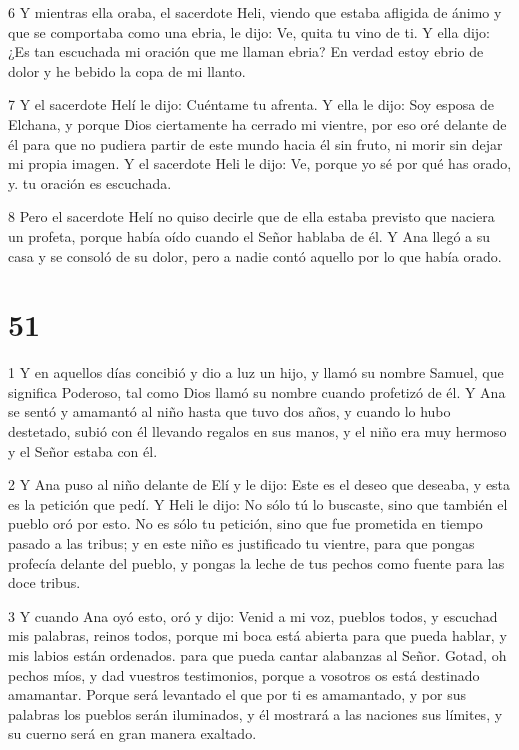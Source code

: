 \par 6 Y mientras ella oraba, el sacerdote Heli, viendo que estaba afligida de ánimo y que se comportaba como una ebria, le dijo: Ve, quita tu vino de ti. Y ella dijo: ¿Es tan escuchada mi oración que me llaman ebria? En verdad estoy ebrio de dolor y he bebido la copa de mi llanto.

\par 7 Y el sacerdote Helí le dijo: Cuéntame tu afrenta. Y ella le dijo: Soy esposa de Elchana, y porque Dios ciertamente ha cerrado mi vientre, por eso oré delante de él para que no pudiera partir de este mundo hacia él sin fruto, ni morir sin dejar mi propia imagen. Y el sacerdote Heli le dijo: Ve, porque yo sé por qué has orado, y. tu oración es escuchada.

\par 8 Pero el sacerdote Helí no quiso decirle que de ella estaba previsto que naciera un profeta, porque había oído cuando el Señor hablaba de él. Y Ana llegó a su casa y se consoló de su dolor, pero a nadie contó aquello por lo que había orado.

\chapter{51}

\par 1 Y en aquellos días concibió y dio a luz un hijo, y llamó su nombre Samuel, que significa Poderoso, tal como Dios llamó su nombre cuando profetizó de él. Y Ana se sentó y amamantó al niño hasta que tuvo dos años, y cuando lo hubo destetado, subió con él llevando regalos en sus manos, y el niño era muy hermoso y el Señor estaba con él.

\par 2 Y Ana puso al niño delante de Elí y le dijo: Este es el deseo que deseaba, y esta es la petición que pedí. Y Heli le dijo: No sólo tú lo buscaste, sino que también el pueblo oró por esto. No es sólo tu petición, sino que fue prometida en tiempo pasado a las tribus; y en este niño es justificado tu vientre, para que pongas profecía delante del pueblo, y pongas la leche de tus pechos como fuente para las doce tribus.

\par 3 Y cuando Ana oyó esto, oró y dijo: Venid a mi voz, pueblos todos, y escuchad mis palabras, reinos todos, porque mi boca está abierta para que pueda hablar, y mis labios están ordenados. para que pueda cantar alabanzas al Señor. Gotad, oh pechos míos, y dad vuestros testimonios, porque a vosotros os está destinado amamantar. Porque será levantado el que por ti es amamantado, y por sus palabras los pueblos serán iluminados, y él mostrará a las naciones sus límites, y su cuerno será en gran manera exaltado.

